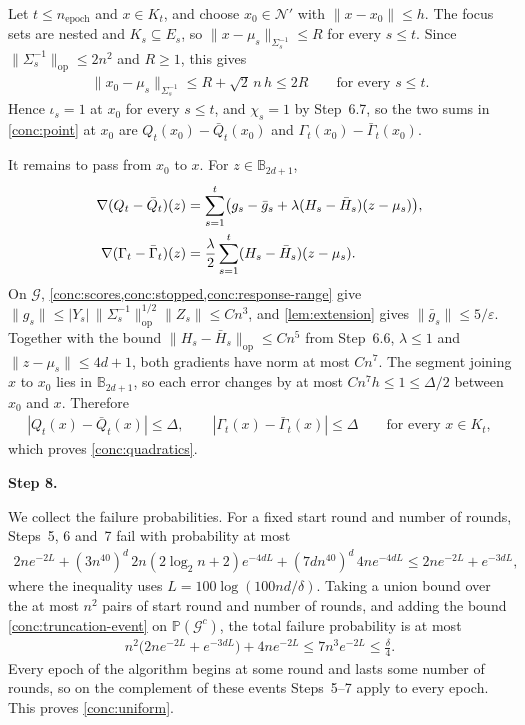 \documentclass[12pt,cleveref]{jmlr}
\renewenvironment{proof}[1][\proofname]
{\par\noindent{\bfseries\upshape #1\ }}
{\jmlrQED}
\newcommand{\proofstepinline}[1]{%
    \par\addvspace{0.6\baselineskip}
    \noindent
    {\normalfont\normalsize\bfseries\color{blue!55!black}Step #1.}\enspace\ignorespaces
}
\newcommand{\Pp}{\mathbb P}
\newcommand{\op}{\mathrm{op}}
\newcommand{\1}{\mathbf 1}
\newcommand{\eps}{\varepsilon}
\begin{document}
\begin{proof}[Proof of \cref{conc:uniform}]
    Let $t\leq n_{\mathrm{epoch}}$ and $x\in K_t$, and choose
    $x_0\in\mathcal N'$ with $\|x-x_0\|\leq h$. The focus sets are nested
    and $K_s\subseteq E_s$, so $\|x-\mu_s\|_{\Sigma_s^{-1}}\leq R$ for every
    $s\leq t$. Since $\|\Sigma_s^{-1}\|_{\op}\leq2n^2$ and $R\geq1$, this
    gives
    \begin{align}
        \|x_0-\mu_s\|_{\Sigma_s^{-1}}
        \leq R+\sqrt2\,n\,h\leq2R
        \qquad\text{for every }s\leq t.
    \end{align}
    Hence $\iota_s=1$ at $x_0$ for every $s\leq t$, and $\chi_s=1$ by
    Step~6.7, so the two sums in \cref{conc:point} at $x_0$ are
    $Q_t(x_0)-\bar Q_t(x_0)$ and $\Gamma_t(x_0)-\bar\Gamma_t(x_0)$.

    It remains to pass from $x_0$ to $x$. For $z\in\mathbb B_{2d+1}$,
    \begin{align}
        \nabla(Q_t-\bar Q_t)(z)
        &=\sum_{s=1}^t\bigl(g_s-\bar g_s
        +\lambda(H_s-\bar H_s)(z-\mu_s)\bigr),\notag\\
        \nabla(\Gamma_t-\bar\Gamma_t)(z)
        &=\frac\lambda2\sum_{s=1}^t(H_s-\bar H_s)(z-\mu_s).
    \end{align}
    On $\mathcal G$, \cref{conc:scores,conc:stopped,conc:response-range}
    give $\|g_s\|\leq|Y_s|\,\|\Sigma_s^{-1}\|_{\op}^{1/2}\|Z_s\|\leq Cn^3$,
    and \cref{lem:extension} gives $\|\bar g_s\|\leq5/\eps$. Together with
    the bound $\|H_s-\bar H_s\|_{\op}\leq Cn^5$ from Step~6.6,
    $\lambda\leq1$ and $\|z-\mu_s\|\leq4d+1$, both gradients have norm at
    most $Cn^7$. The segment joining $x$ to $x_0$ lies in
    $\mathbb B_{2d+1}$, so each error changes by at most
    $Cn^7h\leq1\leq\Delta/2$ between $x_0$ and $x$. Therefore
    \begin{align}
        |Q_t(x)-\bar Q_t(x)|\leq\Delta,\qquad
        |\Gamma_t(x)-\bar\Gamma_t(x)|\leq\Delta
        \qquad\text{for every }x\in K_t,
    \end{align}
    which proves \cref{conc:quadratics}.

    \proofstepinline{8}
    We collect the failure probabilities. For a fixed start round and
    number of rounds, Steps~5, 6 and~7 fail with probability at most
    \begin{align}
        2ne^{-2L}+(3n^{40})^d\,2n(2\log_2n+2)e^{-4dL}
        +(7dn^{40})^d\,4ne^{-4dL}
        \leq2ne^{-2L}+e^{-3dL},
    \end{align}
    where the inequality uses $L=100\log(100nd/\delta)$. Taking a union
    bound over the at most $n^2$ pairs of start round and number of rounds,
    and adding the bound \cref{conc:truncation-event} on
    $\Pp(\mathcal G^c)$, the total failure probability is at most
    \begin{align}
        n^2\bigl(2ne^{-2L}+e^{-3dL}\bigr)+4ne^{-2L}
        \leq7n^3e^{-2L}\leq\frac\delta4.
    \end{align}
    Every epoch of the algorithm begins at some round and lasts some number
    of rounds, so on the complement of these events Steps~5--7 apply to
    every epoch. This proves \cref{conc:uniform}.
\end{proof}
\end{document}
